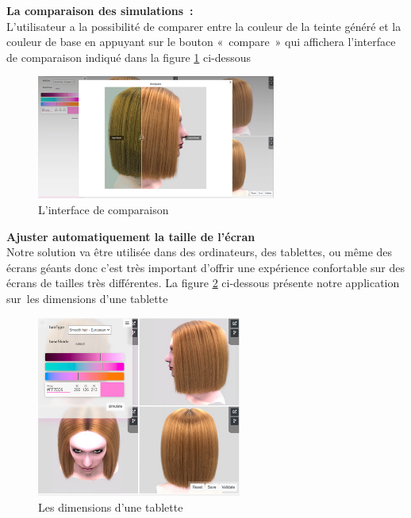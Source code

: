 \newpage
\textbf{La comparaison des simulations :}
\\ 
L’utilisateur a la possibilité de comparer entre la couleur de la teinte généré et la couleur de base en appuyant sur le bouton « compare » qui affichera l’interface de comparaison indiqué dans la figure \ref{fig:comp} ci-dessous
\begin{figure}[!ht]\centering
\includegraphics[width=0.7\textwidth]{chapitres/chapitre5/figures/Compare.png}
\caption{L’interface de comparaison}
\label{fig:comp}
\end{figure}

\textbf{Ajuster automatiquement la taille de l’écran}
\\
Notre solution va être utilisée dans des ordinateurs, des tablettes, ou même des écrans géants donc c’est très important d’offrir une expérience confortable sur des écrans de tailles très différentes.
La figure \ref{fig:auto} ci-dessous présente notre application sur les dimensions d’une tablette
\begin{figure}[!ht]\centering
\includegraphics[width=0.6\textwidth]{chapitres/chapitre5/figures/Responsive.png}
\caption{Les dimensions d’une tablette}
\label{fig:auto}
\end{figure}

